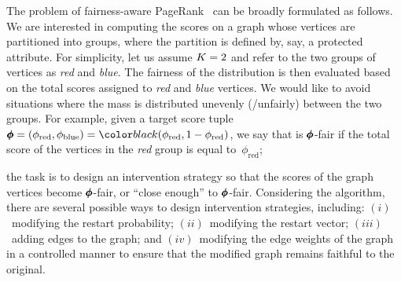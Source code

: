 \documentclass[sigconf, anonymous, review]{acmart}
\begin{document}

\vspace{1mm}
The problem of fairness-aware PageRank~\citep{tsioutsiouliklis_fairness-aware_2021} 
can be broadly formulated as follows.
We are interested in computing the \pagerank scores
on a graph whose vertices are partitioned into \nogroups groups, 
where the partition is defined by, say, a protected attribute. 
For simplicity, let us assume $K=2$ and refer to the two groups 
of vertices as \emph{red} and \emph{blue}.
The fairness of the \pagerank distribution is then evaluated
based on the total \pagerank scores assigned to \emph{red} and \emph{blue} vertices.
We would like to avoid situations where the \pagerank mass is distributed unevenly (/unfairly) 
between the two groups. 
For example, given a target score tuple 
$\groupDist = (\phi_{\text{red}}, \phi_{\text{blue}})= \checkedagtext{(\phi_{\text{red}}, 1-\phi_{\text{red}})}$, 
we say that \pagerank is $\pmb{\phi}$-fair if the total \pagerank score of the
vertices in the \emph{red} group is equal to~$\phi_\mathrm{red}$; 


\vspace{1mm}
the task is to design an intervention strategy so that the \pagerank
scores of the graph vertices become $\pmb{\phi}$-fair, or ``close enough'' to $\pmb{\phi}$-fair.
Considering the \pagerank algorithm, 
there are several possible ways to design intervention strategies, including:
$(i)$~modifying the \pagerank restart probability;
$(ii)$~modifying the restart vector;
$(iii)$~adding edges to the graph; and
$(iv)$~modifying the edge weights of the graph in a controlled manner to ensure that the modified graph remains faithful to the original.
\end{document}
